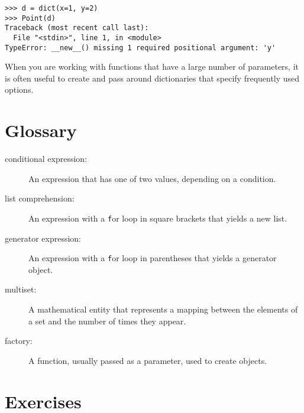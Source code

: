 \documentclass[
DIV=11,
fontsize=13,
twoside,
headinclude=false,
titlepage=firstiscover,
abstract=true,
headsepline=true,
footsepline=true,
chapterprefix=true, %
headings=big,
bibliography=totoc,%
captions=tableheading
]{scrbook}
\theoremstyle{definition}
\begin{document}
\begin{lstlisting}
>>> d = dict(x=1, y=2)
>>> Point(d)
Traceback (most recent call last):
  File "<stdin>", line 1, in <module>
TypeError: __new__() missing 1 required positional argument: 'y'
\end{lstlisting}
%
When you are working with functions that have a large number of
parameters, it is often useful to create and pass around dictionaries
that specify frequently used options.


\section{Glossary}

\begin{description}

\item[conditional expression:] An expression that has one of two
values, depending on a condition.

\item[list comprehension:] An expression with a {\texttt for} loop in square
brackets that yields a new list.

\item[generator expression:] An expression with a {\texttt for} loop in parentheses
that yields a generator object.  

\item[multiset:] A mathematical entity that represents a mapping
between the elements of a set and the number of times they appear.

\item[factory:] A function, usually passed as a parameter, used to
create objects. 

\end{description}




\section{Exercises}
\end{document}

